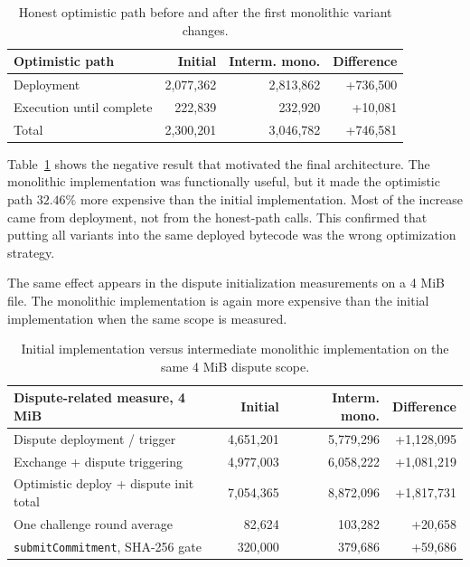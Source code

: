\begin{table}[htbp]
  \centering
  \begin{tabular}{lrrr}
    \toprule
    Optimistic path & Initial & Interm. mono. & Difference \\
    \midrule
    Deployment & 2,077,362 & 2,813,862 & +736,500 \\
    Execution until complete & 222,839 & 232,920 & +10,081 \\
    \midrule
    Total & 2,300,201 & 3,046,782 & +746,581 \\
    \bottomrule
  \end{tabular}
  \caption{Honest optimistic path before and after the first monolithic variant changes.}
  \label{tab:baseline-optimistic}
\end{table}

Table~\ref{tab:baseline-optimistic} shows the negative result that motivated the final
architecture. The monolithic implementation was functionally useful, but it made the
optimistic path \(32.46\%\) more expensive than the initial implementation. Most of the
increase came from deployment, not from the honest-path calls. This confirmed that putting
all variants into the same deployed bytecode was the wrong optimization strategy.

The same effect appears in the dispute initialization measurements on a 4 MiB file. The
monolithic implementation is again more expensive than the initial implementation when the
same scope is measured.

\begin{table}[htbp]
  \centering
  \small
  \begin{tabularx}{\linewidth}{>{\raggedright\arraybackslash}Xrrr}
    \toprule
    Dispute-related measure, 4 MiB & Initial & Interm. mono. & Difference \\
    \midrule
    Dispute deployment / trigger & 4,651,201 & 5,779,296 & +1,128,095 \\
    Exchange + dispute triggering & 4,977,003 & 6,058,222 & +1,081,219 \\
    Optimistic deploy + dispute init total & 7,054,365 & 8,872,096 & +1,817,731 \\
    One challenge round average & 82,624 & 103,282 & +20,658 \\
    \texttt{submitCommitment}, SHA-256 gate & 320,000 & 379,686 & +59,686 \\
    \bottomrule
  \end{tabularx}
  \caption{Initial implementation versus intermediate monolithic implementation on the same 4 MiB dispute scope.}
  \label{tab:baseline-dispute-4mib}
\end{table}

